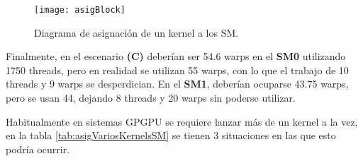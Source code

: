     \begin{figure}[ht]
      \centering
        \texttt{[image: asigBlock]}
        \caption{Diagrama de asignación de un kernel a los SM.}
        \label{fig:asigBlock}
    \end{figure}
    
    Finalmente, en el escenario \textbf{(C)} deberían ser 54.6 warps en el \textbf{SM0} utilizando 1750 threads, pero en realidad se utilizan 55 warps, con lo que el trabajo de 10 threads y 9 warps se desperdician. En el \textbf{SM1}, deberían ocuparse 43.75 warps, pero se usan 44, dejando 8 threads y 20 warps sin poderse utilizar.
    \newline
    
Habitualmente en sistemas GPGPU se requiere lanzar más de un kernel a la vez, en la tabla \ref{tab:asigVariosKernelsSM} se tienen 3 situaciones en las que esto podría ocurrir.
\newline

